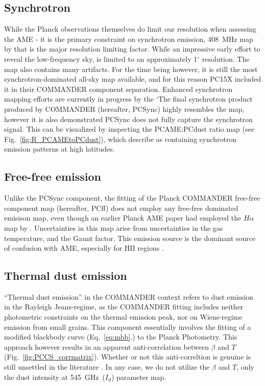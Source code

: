        \subsection{Synchrotron}
          While the Planck observations themselves do limit our resolution when assessing the AME - it is the primary constraint on synchrotron emission, 408~MHz map by \cite{haslam82} that is the major resolution limiting factor. While an impressive early effort to reveal the low-frequency sky, \citep{haslam82} is limited to an approximately 1$^{\circ}$ resolution. The map also contains many artifacts. For the time being however, it is still the most synchrotron-dominated all-sky map available, and for this reason PC15X included it in their COMMANDER component separation. Enhanced synchrotron mapping efforts are currently in progress by the `The final synchrotron product produced by COMMANDER (hereafter, PCSync) highly resembles the \cite{haslam82} map, however it is also demonstrated PCSync does not fully capture the synchrotron signal. This can be visualized by inspecting the PCAME:PCdust ratio map (see Fig.~\ref{fig:R_PCAMEtoPCdust}), which \cite{hensley16} describe as containing synchrotron emission patterns at high latitudes.

       \subsection{Free-free emission}
          Unlike the PCSync component, the fitting of the Planck COMMANDER free-free component map (hereafter, PCff) does not employ any free-free dominated emisison map, even though an earlier Planck AME paper \citep{planckXV} had employed the $H\alpha$ map by \cite{finkbeiner03}. Uncertainties in this map arise from uncertainties in the gas temperature, and the Gaunt factor. This emission source is the dominant source of confusion with AME, especially for HII regions \citep{planckXV,planckXII, paladini15}.

      \subsection{Thermal dust emission}
      ``Thermal dust emission'' in the COMMANDER context refers to dust emission in the Rayleigh Jeans-regime, as the COMMANDER fitting includes neither photometric constraints on the thermal emission peak, nor on Wiens-regime emission from small grains. This component essentially involves the fitting of a modified blackbody curve (Eq.~\ref{eq:mbb}.) to the Planck Photometry. This approach however results in an apparent anti-correlation between $\beta$ and $T$ (Fig.~\ref{fig:PCCS_corrmatrix}). Whether or not this anti-correltion is genuine is still unsettled in the literature \citep{galliano11,juvela12}. In any case, we do not utilize the $\beta$ and $T$, only the dust intensity at 545~GHz~($I_{d}$) parameter map.

